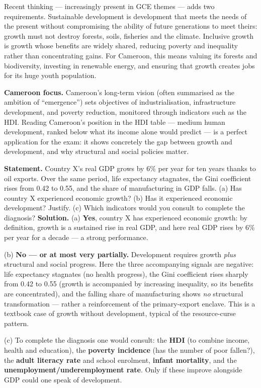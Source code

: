 \documentclass[11pt]{article}
\newcommand{\cle}[1]{{\popxbold\color{popdark}#1}}
\newcounter{popsec}
\newcounter{popsub}
\newcommand{\courssub}[1]{%
  \stepcounter{popsub}%
  \par\vspace{9pt}\noindent{\popxbold\fontsize{11.5}{13}\selectfont\color{popink}{\color{poporange}\thepopsec.\thepopsub}\hspace{6pt}#1}\par\nopagebreak\vspace{4pt}
}
\begin{document}
\courssub{Sustainable Development and Inclusive Growth}

Recent thinking — increasingly present in GCE themes — adds two requirements. \cle{Sustainable development} is development that meets the needs of the present without compromising the ability of future generations to meet theirs: growth must not destroy forests, soils, fisheries and the climate. \cle{Inclusive growth} is growth whose benefits are widely shared, reducing poverty and inequality rather than concentrating gains. For Cameroon, this means valuing its forests and biodiversity, investing in renewable energy, and ensuring that growth creates jobs for its huge youth population.

\textbf{Cameroon focus.} Cameroon's long-term vision (often summarised as the ambition of ``emergence'') sets objectives of industrialisation, infrastructure development, and poverty reduction, monitored through indicators such as the HDI. Reading Cameroon's position in the HDI table — medium human development, ranked below what its income alone would predict — is a perfect application for the exam: it shows concretely the gap between growth and development, and why structural and social policies matter.

\begin{exoresolu}
\textbf{Statement.} Country X's real GDP grows by $6\%$ per year for ten years thanks to oil exports. Over the same period, life expectancy stagnates, the Gini coefficient rises from 0.42 to 0.55, and the share of manufacturing in GDP falls. (a) Has country X experienced economic growth? (b) Has it experienced economic development? Justify. (c) Which indicators would you consult to complete the diagnosis?
\tcblower
\textbf{Solution.}
(a) \textbf{Yes}, country X has experienced economic growth: by definition, growth is a sustained rise in real GDP, and here real GDP rises by $6\%$ per year for a decade — a strong performance.

(b) \textbf{No — or at most very partially.} Development requires growth \emph{plus} structural and social progress. Here the three accompanying signals are negative: life expectancy stagnates (no health progress), the Gini coefficient rises sharply from 0.42 to 0.55 (growth is accompanied by increasing inequality, so its benefits are concentrated), and the falling share of manufacturing shows \emph{no} structural transformation — rather a reinforcement of the primary-export enclave. This is a textbook case of \cle{growth without development}, typical of the resource-curse pattern.

(c) To complete the diagnosis one would consult: the \textbf{HDI} (to combine income, health and education), the \textbf{poverty incidence} (has the number of poor fallen?), the \textbf{adult literacy rate} and school enrolment, \textbf{infant mortality}, and the \textbf{unemployment/underemployment rate}. Only if these improve alongside GDP could one speak of development.
\end{exoresolu}
\end{document}
